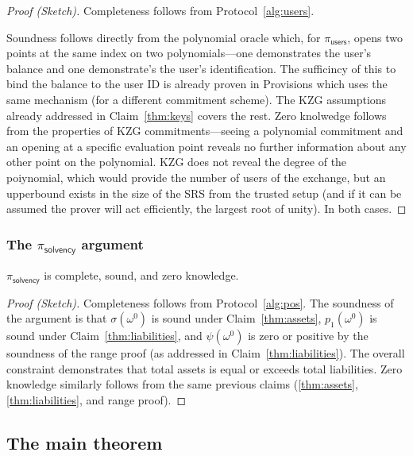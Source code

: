 \begin{proof}[Proof (Sketch)]
Completeness follows from Protocol~\ref{alg:users}. 

Soundness follows directly from the polynomial oracle which, for $\pi_\mathsf{users}$, opens two points at the same index on two polynomials---one demonstrates the user's balance and one demonstrate's the user's identification. The sufficincy of this to bind the balance to the user ID is already proven in Provisions which uses the same mechanism (for a different commitment scheme). The KZG assumptions already addressed in Claim~\ref{thm:keys} covers the rest. Zero knolwedge follows from the properties of KZG commitments---seeing a polynomial commitment and an opening at a specific evaluation point reveals no further information about any other point on the polynomial. KZG does not reveal the degree of the poiynomial, which would provide the number of users of the exchange, but an upperbound exists in the size of the SRS from the trusted setup (and if it can be assumed the prover will act efficiently, the largest root of unity). In both cases. \end{proof}


\subsubsection{The $\pi_\mathsf{solvency}$ argument}


\begin{claim}\label{thm:solvency} $\pi_\mathsf{solvency}$ is complete, sound, and zero knowledge. \end{claim}

\begin{proof}[Proof (Sketch)]
Completeness follows from Protocol~\ref{alg:pos}. The soundness of the argument is that $\sigma(\omega^0)$ is sound under Claim~\ref{thm:assets}, $p_1(\omega^0)$ is sound under Claim~\ref{thm:liabilities}, and $\psi(\omega^0)$ is zero or positive by the soundness of the range proof (as addressed in Claim~\ref{thm:liabilities}). The overall constraint demonstrates that total assets is equal or exceeds total liabilities. Zero knowledge similarly follows from the same previous claims (\ref{thm:assets}, \ref{thm:liabilities}, and range proof).\end{proof}



\subsection{The main theorem}

